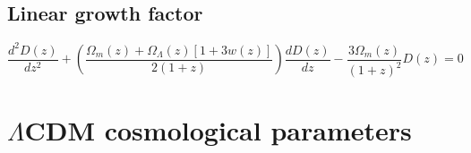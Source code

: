 \begin{equation}
\label{eq:1:delta-lin}
\end{equation} 

\subsection{Linear growth factor}

\begin{equation}
\label{eq:1:growth-diff}
\frac{d^2D(z)}{dz^2} + \left(\frac{\Omega_m(z)+\Omega_\Lambda(z)[1+3w(z)]}{2(1+z)}\right)\frac{dD(z)}{dz}-\frac{3\Omega_m(z)}{(1+z)^2}D(z)= 0
\end{equation}


\section{$\Lambda$CDM cosmological parameters}


